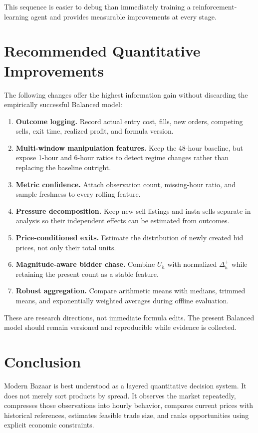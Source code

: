 \documentclass[11pt,a4paper]{article}
\begin{document}
This sequence is easier to debug than immediately training a reinforcement-learning agent and
provides measurable improvements at every stage.

\section{Recommended Quantitative Improvements}

The following changes offer the highest information gain without discarding the empirically
successful Balanced model:

\begin{enumerate}
  \item \textbf{Outcome logging.} Record actual entry cost, fills, new orders, competing sells,
  exit time, realized profit, and formula version.
  \item \textbf{Multi-window manipulation features.} Keep the 48-hour baseline, but expose 1-hour
  and 6-hour ratios to detect regime changes rather than replacing the baseline outright.
  \item \textbf{Metric confidence.} Attach observation count, missing-hour ratio, and sample
  freshness to every rolling feature.
  \item \textbf{Pressure decomposition.} Keep new sell listings and insta-sells separate in
  analysis so their independent effects can be estimated from outcomes.
  \item \textbf{Price-conditioned exits.} Estimate the distribution of newly created bid prices,
  not only their total units.
  \item \textbf{Magnitude-aware bidder chase.} Combine $U_h$ with normalized $\Delta_h^+$ while
  retaining the present count as a stable feature.
  \item \textbf{Robust aggregation.} Compare arithmetic means with medians, trimmed means, and
  exponentially weighted averages during offline evaluation.
\end{enumerate}

These are research directions, not immediate formula edits. The present Balanced model should
remain versioned and reproducible while evidence is collected.

\section{Conclusion}

Modern Bazaar is best understood as a layered quantitative decision system. It does not merely
sort products by spread. It observes the market repeatedly, compresses those observations into
hourly behavior, compares current prices with historical references, estimates feasible trade
size, and ranks opportunities using explicit economic constraints.
\end{document}
